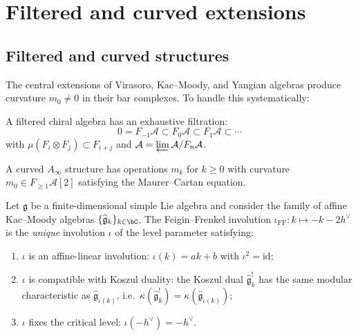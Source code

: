 \section{Filtered and curved extensions}

\subsection{Filtered and curved structures}

The central extensions of Virasoro, Kac--Moody, and Yangian algebras
produce curvature $m_0 \neq 0$ in their bar complexes. To handle
this systematically:

\begin{definition}
A filtered chiral algebra has an exhaustive filtration:
\[0 = F_{-1}\mathcal{A} \subset F_0\mathcal{A} \subset F_1\mathcal{A} \subset \cdots\]
with $\mu(F_i \otimes F_j) \subset F_{i+j}$ and $\mathcal{A} = \varprojlim \mathcal{A}/F_n\mathcal{A}$.
\end{definition}

\begin{definition}\label{def:curved-ainfty-kp}
A curved $A_\infty$ structure has operations $m_k$ for $k \geq 0$ with curvature $m_0 \in F_{\geq 1}\mathcal{A}[2]$ satisfying the Maurer--Cartan equation.
\end{definition}

\begin{proposition}
\label{prop:ff-involution-uniqueness}
Let $\mathfrak{g}$ be a finite-dimensional simple Lie algebra and
consider the family of affine Kac--Moody algebras
$\{\widehat{\mathfrak{g}}_k\}_{k \in \bC}$. The Feigin--Frenkel
involution $\iota_{\mathrm{FF}}: k \mapsto -k - 2h^\vee$ is the
\emph{unique} involution $\iota$ of the level parameter satisfying:
\begin{enumerate}[label=\textup{(\roman*)}]
\item $\iota$ is an affine-linear involution: $\iota(k) = ak + b$
 with $\iota^2 = \mathrm{id}$;
\item $\iota$ is compatible with Koszul duality:
 the Koszul dual $\widehat{\mathfrak{g}}_k^!$ has the same
 modular characteristic as $\widehat{\mathfrak{g}}_{\iota(k)}$,
 i.e.\ $\kappa(\widehat{\mathfrak{g}}_k^!) =
 \kappa(\widehat{\mathfrak{g}}_{\iota(k)})$;
\item $\iota$ fixes the critical level: $\iota(-h^\vee) = -h^\vee$.
\end{enumerate}
\end{proposition}

